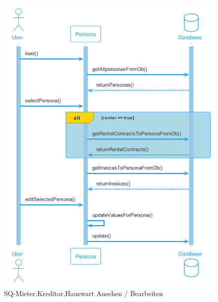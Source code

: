 \begin{figure}[H]
  \begin{center}
    \includegraphics[width=0.7\textheight]{content/diagrams/out/sequenzdiagram/personAnsehen/personAnsehen.png}
    \caption{SQ-Mieter,Kreditor,Hauswart Ansehen / Bearbeiten}
  \end{center}
\end{figure}

